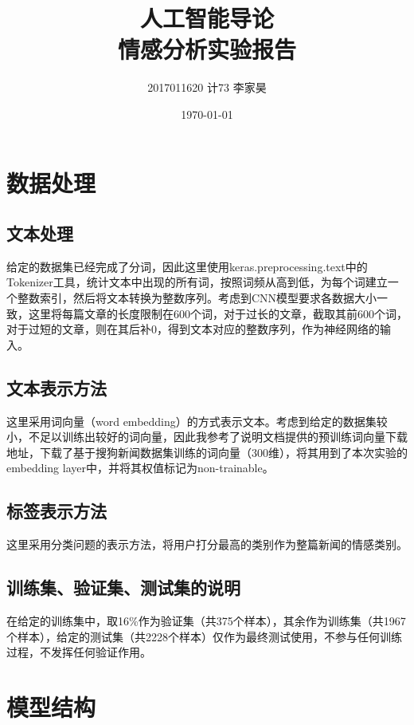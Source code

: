 \documentclass[12pt,a4paper]{article}
\title{人工智能导论 \\ 情感分析实验报告}
\author{2017011620 计73 李家昊}
\date{\today}
\begin{document}
\maketitle

\section{数据处理}

\subsection{文本处理}

给定的数据集已经完成了分词，因此这里使用keras.preprocessing.text中的Tokenizer工具，统计文本中出现的所有词，按照词频从高到低，为每个词建立一个整数索引，然后将文本转换为整数序列。考虑到CNN模型要求各数据大小一致，这里将每篇文章的长度限制在600个词，对于过长的文章，截取其前600个词，对于过短的文章，则在其后补0，得到文本对应的整数序列，作为神经网络的输入。

\subsection{文本表示方法}

这里采用词向量（word
embedding）的方式表示文本。考虑到给定的数据集较小，不足以训练出较好的词向量，因此我参考了说明文档提供的预训练词向量下载地址，下载了基于搜狗新闻数据集训练的词向量（300维），将其用到了本次实验的embedding
layer中，并将其权值标记为non-trainable。

\subsection{标签表示方法}

这里采用分类问题的表示方法，将用户打分最高的类别作为整篇新闻的情感类别。

\subsection{训练集、验证集、测试集的说明}

在给定的训练集中，取16\%作为验证集（共375个样本），其余作为训练集（共1967个样本），给定的测试集（共2228个样本）仅作为最终测试使用，不参与任何训练过程，不发挥任何验证作用。

\section{模型结构}
\end{document}

